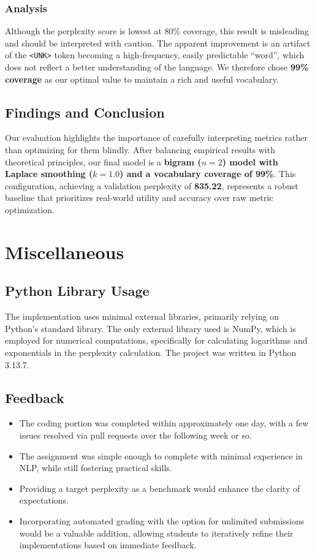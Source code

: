 \documentclass[a4paper]{article}
\begin{document}
\subsubsection{Analysis}
Although the perplexity score is lowest at 80\% coverage, this result is misleading and should be interpreted with caution. The apparent improvement is an artifact of the \texttt{<UNK>} token becoming a high-frequency, easily predictable ``word'', which does not reflect a better understanding of the language. We therefore chose \textbf{99\% coverage} as our optimal value to maintain a rich and useful vocabulary.

\subsection{Findings and Conclusion}
Our evaluation highlights the importance of carefully interpreting metrics rather than optimizing for them blindly. After balancing empirical results with theoretical principles, our final model is a \textbf{bigram ($n=2$) model with Laplace smoothing ($k=1.0$) and a vocabulary coverage of 99\%}. This configuration, achieving a validation perplexity of \textbf{835.22}, represents a robust baseline that prioritizes real-world utility and accuracy over raw metric optimization.


\section{Miscellaneous}

\subsection{Python Library Usage}
The implementation uses minimal external libraries, primarily relying on Python's standard library. The only external library used is NumPy, which is employed for numerical computations, specifically for calculating logarithms and exponentials in the perplexity calculation. The project was written in Python 3.13.7.

\subsection{Feedback}
\begin{itemize}
  \item The coding portion was completed within approximately one day, with a few issues resolved via pull requests over the following week or so.
  \item The assignment was simple enough to complete with minimal experience in NLP, while still fostering practical skills.
  \item Providing a target perplexity as a benchmark would enhance the clarity of expectations.
  \item Incorporating automated grading with the option for unlimited submissions would be a valuable addition, allowing students to iteratively refine their implementations based on immediate feedback.
\end{itemize}
\end{document}
